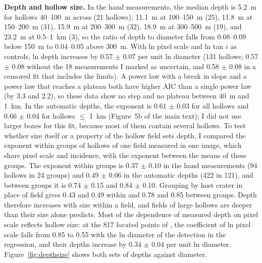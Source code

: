 \documentclass{planetary}
\begin{document}
\textbf{Depth and hollow size.} In the hand measurements, the median depth is 5.2~m for hollows 40--100~m across (21 hollows), 11.1~m at 100--150~m (25), 11.8~m at 150--200~m (31), 15.9~m at 200--300~m (32), 18.9~m at 300--500~m (19), and 23.2~m at 0.5--1~km (3), so the ratio of depth to diameter falls from 0.08--0.09 below 150~m to 0.04--0.05 above 300~m. With ln pixel scale and ln tan $i$ as controls, ln depth increases by 0.57 $\pm$ 0.07 per unit ln diameter (131 hollows; 0.57 $\pm$ 0.08 without the 18 measurements I marked as uncertain, and 0.58 $\pm$ 0.08 in a censored fit that includes the limits). A power law with a break in slope and a power law that reaches a plateau both have higher AIC than a single power law (by 3.3 and 2.2), so these data show no step and no plateau between 40~m and 1~km. In the automatic depths, the exponent is 0.61 $\pm$ 0.03 for all hollows and 0.66 $\pm$ 0.04 for hollows $\leq$ 1~km (Figure~5b of the main text); I did not use larger boxes for this fit, because most of them contain several hollows. To test whether size itself or a property of the hollow field sets depth, I compared the exponent within groups of hollows of one field measured in one image, which share pixel scale and incidence, with the exponent between the means of these groups. The exponent within groups is 0.37 $\pm$ 0.10 in the hand measurements (94 hollows in 24 groups) and 0.49 $\pm$ 0.06 in the automatic depths (422 in 121), and between groups it is 0.74 $\pm$ 0.15 and 0.84 $\pm$ 0.10. Grouping by host crater in place of field gives 0.43 and 0.49 within and 0.78 and 0.85 between groups. Depth therefore increases with size within a field, and fields of large hollows are deeper than their size alone predicts. Most of the dependence of measured depth on pixel scale reflects hollow size: at the 817 located points of \textcite{blewett2016}, the coefficient of ln pixel scale falls from 0.85 to 0.55 with the ln diameter of the detection in the regression, and their depths increase by 0.34 $\pm$ 0.04 per unit ln diameter. Figure~\ref{fig:depthsize} shows both sets of depths against diameter.
\end{document}
